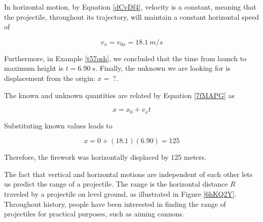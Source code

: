 \documentclass[main.tex]{subfiles}
\begin{document}
In horizontal motion, by Equation \eqref{dCvDf4}, velocity is a constant, meaning that the projectile, throughout its trajectory, will maintain a constant horizontal speed of 

\begin{equation*}
    v_x = v_{0x} = \SI{18.1}{m/s}
\end{equation*}


Furthermore, in Example \ref{t57osh}, we concluded that the time from launch to maximum height is $t = \SI{6.90}{s}$. Finally, the unknown we are looking for is displacement from the origin: $x =\ ?$.

\vspace{1em}

The known and unknown quantities are related by Equation \eqref{7fMAPG} as

\begin{equation*}
    x = x_0 + v_x t
\end{equation*}

Substituting known values leads to 

\begin{equation*}
    x = 0 + (18.1)(6.90) = 125 
\end{equation*}

Therefore, the firework was horizontally displaced by 125 meters.

\solutionEnd


The fact that vertical and horizontal motions are independent of each other lets us predict the range of a projectile. The \gls{range} is the horizontal distance $R$ traveled by a projectile on level ground, as illustrated in Figure \ref{6hKQ2Y}. Throughout history, people have been interested in finding the range of projectiles for practical purposes, such as aiming cannons.
\end{document}
